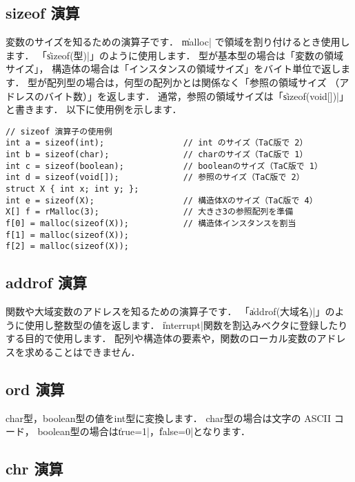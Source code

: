 \subsection{sizeof 演算}

変数のサイズを知るための演算子です．
\|malloc| で領域を割り付けるとき使用します．
「\|sizeof(型)|」のように使用します．
型が基本型の場合は「変数の領域サイズ」，
構造体の場合は「インスタンスの領域サイズ」をバイト単位で返します．
型が配列型の場合は，何型の配列かとは関係なく「参照の領域サイズ
（アドレスのバイト数）」を返します．
通常，参照の領域サイズは「\|sizeof(void[])|」と書きます．
以下に使用例を示します．

\begin{mylist}
\begin{verbatim}
// sizeof 演算子の使用例
int a = sizeof(int);                // int のサイズ（TaC版で 2）
int b = sizeof(char);               // charのサイズ（TaC版で 1）
int c = sizeof(boolean);            // booleanのサイズ（TaC版で 1）
int d = sizeof(void[]);             // 参照のサイズ（TaC版で 2）
struct X { int x; int y; };
int e = sizeof(X);                  // 構造体Xのサイズ（TaC版で 4）
X[] f = rMalloc(3);                 // 大きさ3の参照配列を準備
f[0] = malloc(sizeof(X));           // 構造体インスタンスを割当
f[1] = malloc(sizeof(X));
f[2] = malloc(sizeof(X));
\end{verbatim}
\end{mylist}

\subsection{addrof 演算}
\label{chap3:addrof}

関数や大域変数のアドレスを知るための演算子です．
「\|addrof(大域名)|」のように使用し整数型の値を返します．
\|interrupt|関数を割込みベクタに登録したりする目的で使用します．
配列や構造体の要素や，関数のローカル変数のアドレスを求めることはできません．

\subsection{ord 演算}
\label{chap3:ord}

char型，boolean型の値をint型に変換します．
char型の場合は文字の ASCII コード，
boolean型の場合は\|true=1|，\|false=0|となります．

\subsection{chr 演算}
\label{chap3:chr}

